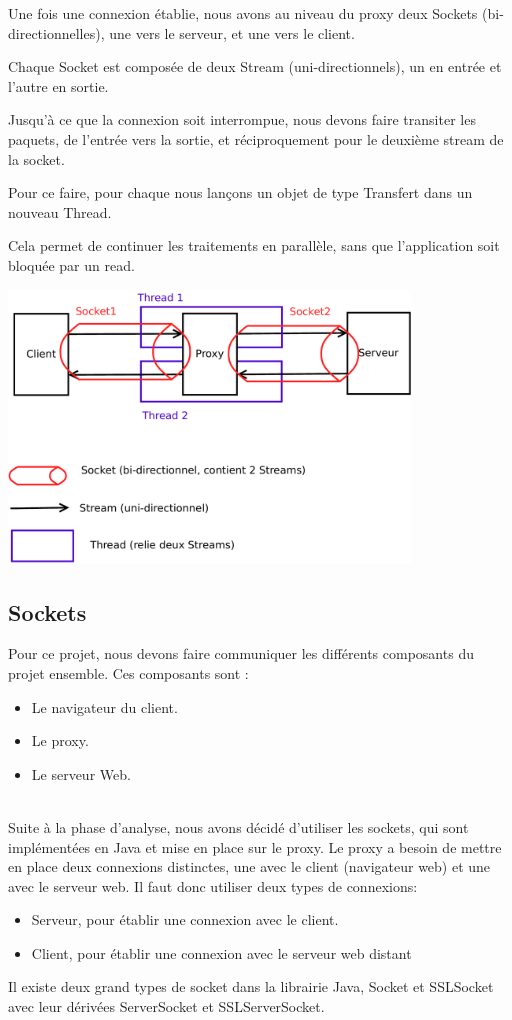 \documentclass[a4paper,11pt,french]{report}
\begin{document}
Une fois une connexion établie, nous avons au niveau du proxy deux Sockets (bi-directionnelles), une vers le serveur, et une vers le client.

Chaque Socket est composée de deux Stream (uni-directionnels), un en entrée et l'autre en sortie.

Jusqu'à ce que la connexion soit interrompue, nous devons faire transiter les paquets, de l'entrée vers la sortie, et réciproquement pour le deuxième stream de la socket.

Pour ce faire, pour chaque nous lançons un objet de type Transfert dans un nouveau Thread.

Cela permet de continuer les traitements en parallèle, sans que l'application soit bloquée par un read.

\includegraphics[width=0.8\textwidth]{images/thread.pdf}

\subsection{Sockets}
Pour ce projet, nous devons faire communiquer les différents composants du projet ensemble. Ces composants sont :
\begin{itemize}
\item Le navigateur du client.
\item Le proxy.
\item Le serveur Web.
\end{itemize}
~~\\

Suite à la phase d'analyse, nous avons décidé d'utiliser les sockets, qui sont implémentées en Java 
et mise en place sur le proxy. Le proxy a besoin de mettre en place deux 
connexions distinctes, une avec le client (navigateur web) et une avec le serveur web. Il faut donc utiliser 
deux types de connexions:
\begin{itemize}
  \item Serveur, pour établir une connexion avec le client.
  \item Client, pour établir une connexion avec le serveur web distant
\end{itemize}
Il existe deux grand types de socket dans la librairie Java, Socket et SSLSocket 
avec leur dérivées ServerSocket et SSLServerSocket.
~~\\
\end{document}
